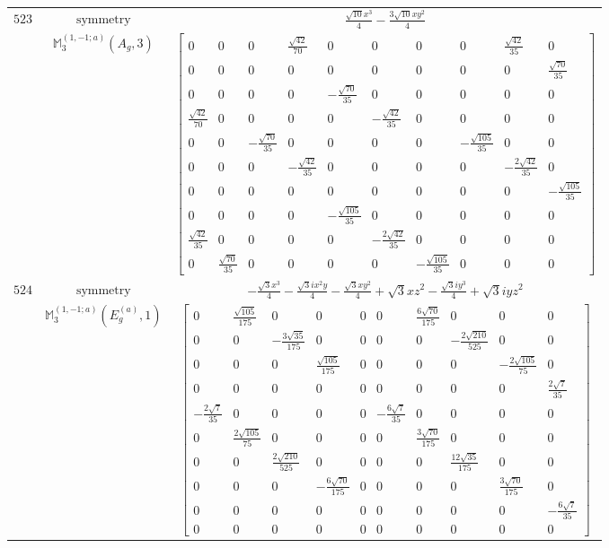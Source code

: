 \documentclass[fleqn,8pt,landscape]{jsarticle}
\begin{document}
\begin{longtable}{ccc}
$ 523 $ & $ \text{symmetry} $ & $ \frac{\sqrt{10} x^{3}}{4} - \frac{3 \sqrt{10} x y^{2}}{4} $ \\
$  $ & $ \mathbb{M}_{3}^{(1,-1;a)}(A_{g},3) $ & $ \begin{bmatrix} 0 & 0 & 0 & \frac{\sqrt{42}}{70} & 0 & 0 & 0 & 0 & \frac{\sqrt{42}}{35} & 0 \\ 0 & 0 & 0 & 0 & 0 & 0 & 0 & 0 & 0 & \frac{\sqrt{70}}{35} \\ 0 & 0 & 0 & 0 & - \frac{\sqrt{70}}{35} & 0 & 0 & 0 & 0 & 0 \\ \frac{\sqrt{42}}{70} & 0 & 0 & 0 & 0 & - \frac{\sqrt{42}}{35} & 0 & 0 & 0 & 0 \\ 0 & 0 & - \frac{\sqrt{70}}{35} & 0 & 0 & 0 & 0 & - \frac{\sqrt{105}}{35} & 0 & 0 \\ 0 & 0 & 0 & - \frac{\sqrt{42}}{35} & 0 & 0 & 0 & 0 & - \frac{2 \sqrt{42}}{35} & 0 \\ 0 & 0 & 0 & 0 & 0 & 0 & 0 & 0 & 0 & - \frac{\sqrt{105}}{35} \\ 0 & 0 & 0 & 0 & - \frac{\sqrt{105}}{35} & 0 & 0 & 0 & 0 & 0 \\ \frac{\sqrt{42}}{35} & 0 & 0 & 0 & 0 & - \frac{2 \sqrt{42}}{35} & 0 & 0 & 0 & 0 \\ 0 & \frac{\sqrt{70}}{35} & 0 & 0 & 0 & 0 & - \frac{\sqrt{105}}{35} & 0 & 0 & 0 \end{bmatrix} $ \\ \hline
$ 524 $ & $ \text{symmetry} $ & $ - \frac{\sqrt{3} x^{3}}{4} - \frac{\sqrt{3} i x^{2} y}{4} - \frac{\sqrt{3} x y^{2}}{4} + \sqrt{3} x z^{2} - \frac{\sqrt{3} i y^{3}}{4} + \sqrt{3} i y z^{2} $ \\
$  $ & $ \mathbb{M}_{3}^{(1,-1;a)}(E_{g}^{(a)},1) $ & $ \begin{bmatrix} 0 & \frac{\sqrt{105}}{175} & 0 & 0 & 0 & 0 & \frac{6 \sqrt{70}}{175} & 0 & 0 & 0 \\ 0 & 0 & - \frac{3 \sqrt{35}}{175} & 0 & 0 & 0 & 0 & - \frac{2 \sqrt{210}}{525} & 0 & 0 \\ 0 & 0 & 0 & \frac{\sqrt{105}}{175} & 0 & 0 & 0 & 0 & - \frac{2 \sqrt{105}}{75} & 0 \\ 0 & 0 & 0 & 0 & 0 & 0 & 0 & 0 & 0 & \frac{2 \sqrt{7}}{35} \\ - \frac{2 \sqrt{7}}{35} & 0 & 0 & 0 & 0 & - \frac{6 \sqrt{7}}{35} & 0 & 0 & 0 & 0 \\ 0 & \frac{2 \sqrt{105}}{75} & 0 & 0 & 0 & 0 & \frac{3 \sqrt{70}}{175} & 0 & 0 & 0 \\ 0 & 0 & \frac{2 \sqrt{210}}{525} & 0 & 0 & 0 & 0 & \frac{12 \sqrt{35}}{175} & 0 & 0 \\ 0 & 0 & 0 & - \frac{6 \sqrt{70}}{175} & 0 & 0 & 0 & 0 & \frac{3 \sqrt{70}}{175} & 0 \\ 0 & 0 & 0 & 0 & 0 & 0 & 0 & 0 & 0 & - \frac{6 \sqrt{7}}{35} \\ 0 & 0 & 0 & 0 & 0 & 0 & 0 & 0 & 0 & 0 \end{bmatrix} $ \\ \hline

\end{longtable}
\end{document}
